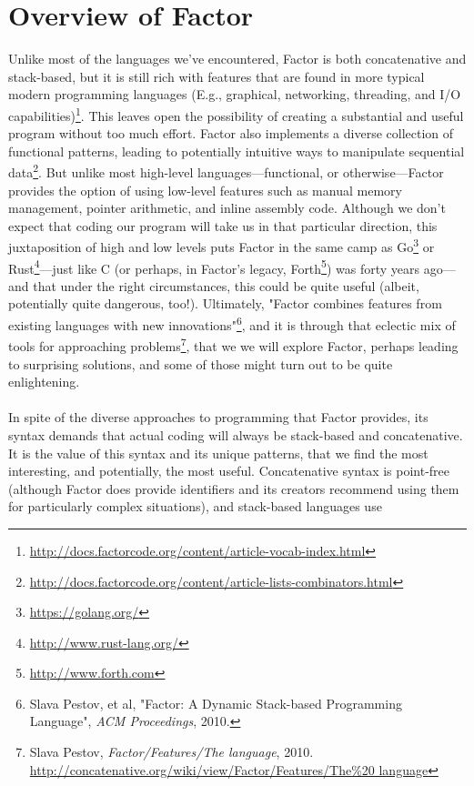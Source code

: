 \documentclass{sig-alternate}
\begin{document}
\section{Overview of Factor}
Unlike most of the languages we've encountered, Factor is both concatenative and stack-based, but it is still rich with
features that are found in more typical modern programming languages
(E.g., graphical, networking, threading, and I/O capabilities)\footnote{\url{http://docs.factorcode.org/content/article-vocab-index.html}}. This
leaves open the possibility of creating a substantial and useful
program without too much effort. Factor also implements a diverse
collection of functional patterns, leading to potentially intuitive ways to manipulate sequential data\footnote{\url{http://docs.factorcode.org/content/article-lists-combinators.html}}. But unlike most high-level languages---functional, or otherwise---Factor provides the option of using low-level
 features such as manual memory management, pointer arithmetic,
and inline assembly code. Although we don't expect that coding our
program will take us in that particular direction, this
juxtaposition of high and low levels puts Factor in the same camp as Go\footnote{\url{https://golang.org/}} or Rust\footnote{\url{http://www.rust-lang.org/}}---just like C (or perhaps, in Factor's legacy, Forth\footnote{\url{http://www.forth.com}}) was forty years ago---and that under the right circumstances, this could be
quite useful (albeit, potentially quite dangerous, too!).  Ultimately, "Factor combines features from existing languages with new
innovations"\footnote{Slava Pestov, et al, "Factor: A Dynamic Stack-based Programming Language", \textit{ACM Proceedings}, 2010.}, and it is through that eclectic mix of tools for approaching problems\footnote{Slava Pestov, \textit{Factor/Features/The language}, 2010. \url{http://concatenative.org/wiki/view/Factor/Features/The\%20 language}}, that we we will explore Factor, perhaps leading to surprising solutions, and some of those might turn out to be quite enlightening.
\\\\
In spite of the diverse approaches to programming that Factor
provides, its syntax demands that actual coding will always be stack-based
 and concatenative. It is the value of this syntax and its unique
patterns, that we find the most interesting, and potentially, the most
useful. Concatenative syntax is point-free (although Factor does
provide identifiers and its creators recommend using them for
particularly complex situations), and stack-based languages use
\end{document}
